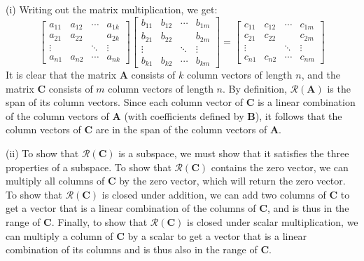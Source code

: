 \begin{enumerate}[label=(\alph*)]
	      \par (i) Writing out the matrix multiplication, we get:
	      $$
		      \left[\begin{array}{cccc}
				      a_{11}  & a_{12} & \cdots & a_{1 k} \\
				      a_{21}  & a_{22} &        & a_{2 k} \\
				      \vdots  &        & \ddots & \vdots  \\
				      a_{n 1} & a_{n2} & \cdots & a_{n k}
			      \end{array}\right]
		      \left[\begin{array}{cccc}
				      b_{11}  & b_{12}  & \cdots & b_{1 m} \\
				      b_{21}  & b_{22}  &        & b_{2 m} \\
				      \vdots  &         & \ddots & \vdots  \\
				      b_{k 1} & b_{k 2} & \cdots & b_{k m}
			      \end{array}\right]=
		      \left[\begin{array}{cccc}
				      c_{11}  & c_{12}  & \cdots & c_{1 m} \\
				      c_{21}  & c_{22}  &        & c_{2 m} \\
				      \vdots  &         & \ddots & \vdots  \\
				      c_{n 1} & c_{n 2} & \cdots & c_{n m}
			      \end{array}\right]
	      $$
	      It is clear that the matrix $\mathbf{A}$ consists of $k$ column
	      vectors of length $n$, and the matrix $\mathbf{C}$ consists of $m$
	      column vectors of length $n$. By
	      definition, $\mathcal{R}(\mathbf{A})$ is the span of its column
	      vectors. Since each column vector of $\mathbf{C}$ is a linear
	      combination of the column vectors of $\mathbf{A}$ (with coefficients
	      defined by $\mathbf{B}$), it follows that
	      the column vectors of $\mathbf{C}$ are in the span of the column
	      vectors of $\mathbf{A}$.

	      \par (ii) To show that $\mathcal{R}(\mathbf{C})$ is a subspace, we must
	      show that it satisfies the three properties of a subspace. To show
	      that $\mathcal{R}(\mathbf{C})$ contains the zero vector, we can
	      multiply all columns of $\mathbf{C}$ by the zero vector, which will
	      return the zero vector. To show that $\mathcal{R}(\mathbf{C})$ is
	      closed under addition, we can add two columns of $\mathbf{C}$ to get
	      a vector that is a linear combination of the columns of $\mathbf{C}$,
	      and is thus in the range of $\mathbf{C}$.
	      Finally, to show that $\mathcal{R}(\mathbf{C})$ is closed under scalar
	      multiplication, we can multiply a column of $\mathbf{C}$ by a scalar
	      to get a vector that is a linear combination of its columns and is
	      thus also in the range of $\mathbf{C}$.


\end{enumerate}

